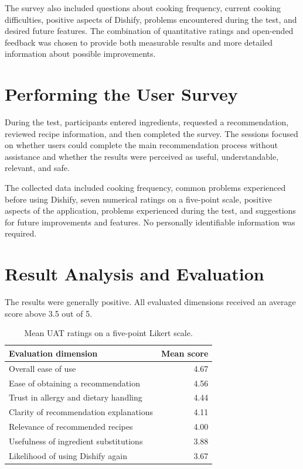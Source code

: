 The survey also included questions about cooking frequency, current cooking
difficulties, positive aspects of Dishify, problems encountered during the test,
and desired future features. The combination of quantitative ratings and
open-ended feedback was chosen to provide both measurable results and more
detailed information about possible improvements.

\section{Performing the User Survey}

During the test, participants entered ingredients, requested a recommendation,
reviewed recipe information, and then completed the survey. The sessions focused
on whether users could complete the main recommendation process without
assistance and whether the results were perceived as useful, understandable,
relevant, and safe.

The collected data included cooking frequency, common problems experienced
before using Dishify, seven numerical ratings on a five-point scale, positive
aspects of the application, problems experienced during the test, and
suggestions for future improvements and features. No personally identifiable
information was required.

\section{Result Analysis and Evaluation}

The results were generally positive. All evaluated dimensions received an
average score above 3.5 out of 5.

\begin{table}[!ht]
    \centering
    \caption{Mean UAT ratings on a five-point Likert scale.}
    \label{tab:uat-results}
    \begin{tabular}{@{}lr@{}}
        \toprule
        \textbf{Evaluation dimension} & \textbf{Mean score} \\
        \midrule
        Overall ease of use                    & 4.67 \\
        Ease of obtaining a recommendation     & 4.56 \\
        Trust in allergy and dietary handling  & 4.44 \\
        Clarity of recommendation explanations & 4.11 \\
        Relevance of recommended recipes       & 4.00 \\
        Usefulness of ingredient substitutions & 3.88 \\
        Likelihood of using Dishify again       & 3.67 \\
        \bottomrule
    \end{tabular}
\end{table}

